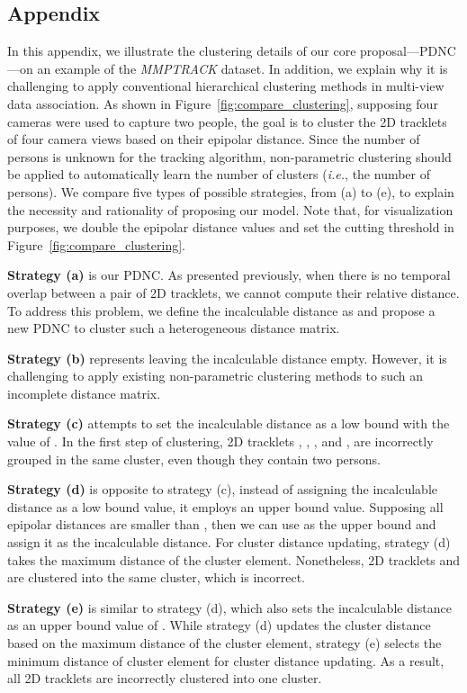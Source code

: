 \documentclass{CVM}
\newcommand{\ie}{{\it i.e.}}
\begin{document}
\subsection*{Appendix}
In this appendix, we illustrate the clustering details of our core proposal---PDNC---on an example of the \textit{MMPTRACK} dataset. In addition, we explain why it is challenging to apply conventional hierarchical clustering methods in multi-view data association. As shown in Figure~\ref{fig:compare_clustering}, supposing four cameras were used to capture two people, the goal is to cluster the 2D tracklets of four camera views based on their epipolar distance. Since the number of persons is unknown for the tracking algorithm, non-parametric clustering should be applied to automatically learn the number of clusters (\ie, the number of persons). We compare five types of possible strategies, from (a) to (e), to explain the necessity and rationality of proposing our model. Note that, for visualization purposes, we double the epipolar distance values and set the cutting threshold  in Figure~\ref{fig:compare_clustering}.

\noindent \textbf{Strategy (a)} is our PDNC. As presented previously, when there is no temporal overlap between a pair of 2D tracklets, we cannot compute their relative distance. To address this problem, we define the incalculable distance as  and propose a new PDNC to cluster such a heterogeneous distance matrix. 

\noindent \textbf{Strategy (b)} represents leaving the incalculable distance empty. However, it is challenging to apply existing non-parametric clustering methods to such an incomplete distance matrix.

\noindent \textbf{Strategy (c)} attempts to set the incalculable distance as a low bound with the value of . In the first step of clustering, 2D tracklets , , , and , are incorrectly grouped in the same cluster, even though they contain two persons.


\noindent \textbf{Strategy (d)} is opposite to strategy (c), instead of assigning the incalculable distance as a low bound value, it employs an upper bound value. Supposing all epipolar distances are smaller than , then we can use  as the upper bound and assign it as the incalculable distance. For cluster distance updating, strategy (d) takes the maximum distance of the cluster element. Nonetheless, 2D tracklets  and  are clustered into the same cluster, which is incorrect.

\noindent \textbf{Strategy (e)} is similar to strategy (d), which also sets the incalculable distance as an upper bound value of . While strategy (d) updates the cluster distance based on the maximum distance of the cluster element, strategy (e) selects the minimum distance of cluster element for cluster distance updating. As a result, all 2D tracklets are incorrectly clustered into one cluster.
\end{document}
